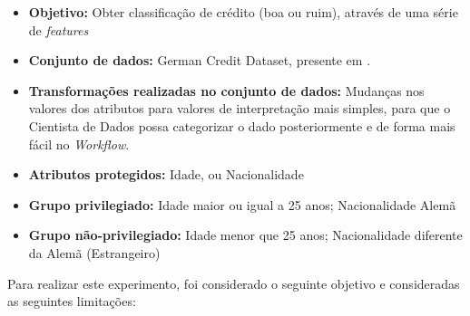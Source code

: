 \documentclass[portugues]{ic-tese}
\begin{document}
\begin{itemize}
\item \textbf{Objetivo:} Obter classificação de crédito (boa ou ruim), através de uma série de \textit{features}

\item \textbf{Conjunto de dados:} German Credit Dataset, presente em \citep{ucigerman_2021}.

\item \textbf{Transformações realizadas no conjunto de dados:} Mudanças nos valores dos atributos para valores de interpretação mais simples, para que o Cientista de Dados possa categorizar o dado posteriormente e de forma mais fácil no \textit{Workflow}.

\item \textbf{Atributos protegidos:} Idade, ou Nacionalidade

\item \textbf{Grupo privilegiado:} Idade maior ou igual a 25 anos; Nacionalidade Alemã

\item \textbf{Grupo não-privilegiado:} Idade menor que 25 anos; Nacionalidade diferente da Alemã (Estrangeiro)

\end{itemize}

Para realizar este experimento, foi considerado o seguinte objetivo e consideradas as seguintes limitações:
\end{document}
